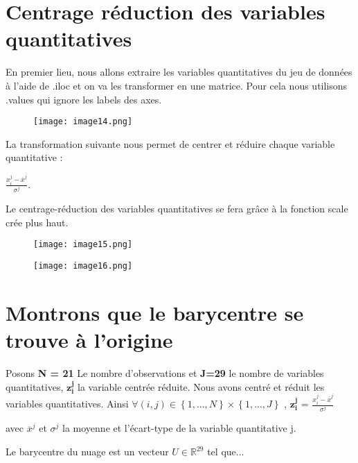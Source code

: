 \documentclass{article}
\begin{document}
\section{Centrage réduction des variables quantitatives}

En premier lieu, nous allons extraire les variables quantitatives du jeu de données à l'aide de .iloc et on va les transformer en une matrice. Pour cela nous utilisons .values qui ignore les labels des axes.

\begin{figure}[h]
    \centering
    \texttt{[image: image14.png]}
    \label{fig:enter-label}
\end{figure}

La transformation suivante nous permet de centrer et réduire chaque variable quantitative : 

\begin{center}
$\displaystyle \frac{x_{i}^{j}-\overline{x}^{j}}{\sigma^{j}}$.
\end{center}

Le centrage-réduction des variables quantitatives se fera grâce à la fonction scale crée plus haut. 

\begin{figure}[H]
    \centering
    \texttt{[image: image15.png]}
    \label{fig:enter-label}
\end{figure}

\begin{figure}[H]
    \centering
    \texttt{[image: image16.png]}
    \label{fig:enter-label}
\end{figure}

\section{Montrons que le barycentre se trouve à l'origine}

Posons \textbf{N = 21} Le nombre d'observations et \textbf{J=29} le nombre de variables quantitatives,
$\mathbf{z_{i}^{j}}$ la variable centrée réduite.
Nous avons centré et réduit les variables quantitatives.
Ainsi 
$\forall(i,j)\in \left\{1,...,N\right\}\times\left\{1,...,J\right\}$ ,   $\mathbf{z_{i}^{j}}$ = $\displaystyle \frac{x_{i}^{j}-\overline{x}^{j}}{\sigma^{j}}$ 

avec $\overline{x}^{j}$ et $\sigma^{j}$ la moyenne et l'écart-type de la variable quantitative j. 

Le barycentre du nuage est un vecteur \(U \in \mathbb{R}^{29}\) tel que...
\end{document}
